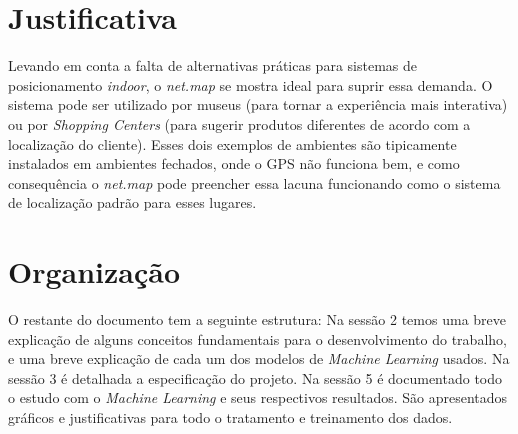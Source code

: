 \section{Justificativa}\label{sec:justify}
Levando em conta a falta de alternativas práticas para sistemas de posicionamento \textit{indoor}, o \textit{net.map} se mostra ideal para suprir essa demanda. O sistema pode ser utilizado por museus (para tornar a experiência mais interativa) ou por \textit{Shopping Centers}  (para sugerir produtos diferentes de acordo com a localização do cliente). Esses dois exemplos de ambientes são tipicamente instalados em ambientes fechados, onde o GPS não funciona bem, e como consequência o \textit{net.map} pode preencher essa lacuna funcionando como o sistema de localização padrão para esses lugares.

\section{Organização}\label{sec:organization}

O restante do documento tem a seguinte estrutura: Na sessão 2 temos uma breve explicação de alguns conceitos fundamentais para o desenvolvimento do trabalho, e uma breve explicação de cada um dos modelos de \textit{Machine Learning} usados. Na sessão 3 é detalhada a especificação do projeto. Na sessão 5 é documentado todo o estudo com o \textit{Machine Learning} e seus respectivos resultados. São apresentados gráficos e justificativas para todo o tratamento e treinamento dos dados.